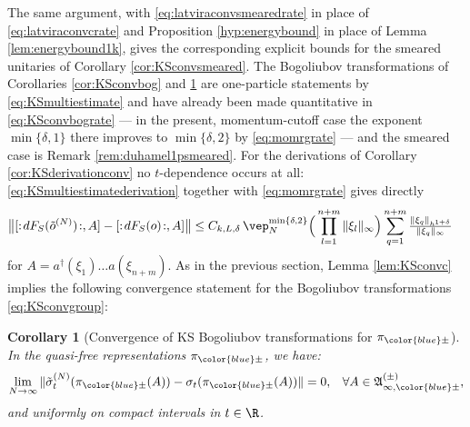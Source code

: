 \documentclass[a4paper, 11pt]{article}
\newcommand{\fA}{\mathfrak{A}}\newcommand{\cA}{\mathcal{A}}\newcommand{\dA}{\mathds{A}}\newcommand{\sA}{\mathscr{A}}
\DeclareMathOperator{\1}{\mathds{1}}
\newtheorem{cor}[thm]{Corollary}
\begin{document}
The same argument, with \eqref{eq:latviraconvsmearedrate} in place of \eqref{eq:latviraconvcrate} and Proposition \ref{hyp:energybound} in place of Lemma \ref{lem:energybound1k}, gives the corresponding explicit bounds for the smeared unitaries of Corollary \ref{cor:KSconvsmeared}. The Bogoliubov transformations of Corollaries \ref{cor:KSconvbog} and \ref{cor:KSconvbogc} are one-particle statements by \eqref{eq:KSmultiestimate} and have already been made quantitative in \eqref{eq:KSconvbograte} --- in the present, momentum-cutoff case the exponent $\min\{\delta,1\}$ there improves to $\min\{\delta,2\}$ by \eqref{eq:momrgrate} --- and the smeared case is Remark \ref{rem:duhamel1psmeared}. For the derivations of Corollary \ref{cor:KSderivationconv} no $t$-dependence occurs at all: \eqref{eq:KSmultiestimatederivation} together with \eqref{eq:momrgrate} gives directly
\begin{align}
\label{eq:KSconvbogderrate}
\big\|[:\!dF_{S}(\tilde{o}^{(N)})\!:,A]-[:\!dF_{S}(o)\!:,A]\big\| & \leq C_{k,L,\delta}\!\ \vep_{N}^{\min\{\delta,2\}}\Big(\prod_{l=1}^{n+m}\|\xi_{l}\|_{\infty}\Big)\sum_{q=1}^{n+m}\tfrac{\|\xi_{q}\|_{h^{1+\delta}}}{\|\xi_{q}\|_{\infty}}
\end{align}
for $A=a^{\dagger}(\xi_{1})\dots a(\xi_{n+m})$.
As in the previous section, Lemma \ref{lem:KSconvc} implies the following convergence statement for the Bogoliubov transformations \eqref{eq:KSconvgroup}:
\begin{cor}[Convergence of KS Bogoliubov transformations for $\pi_{{\color{blue}\pm}}$]
\label{cor:KSconvbogc}
In the quasi-free representations $\pi_{{\color{blue}\pm}}$, we have:
\begin{align*}
\lim_{N\rightarrow\infty}\|\tilde{\sigma}^{(N)}_{t}(\pi_{{\color{blue}\pm}}(A)) - \sigma_{t}(\pi_{{\color{blue}\pm}}(A))\| & = 0, & \forall A\in\fA^{(\pm)}_{\infty,{\color{blue}\pm}},
\end{align*}
and uniformly on compact intervals in $t\in\R$.
\end{cor}
\end{document}
